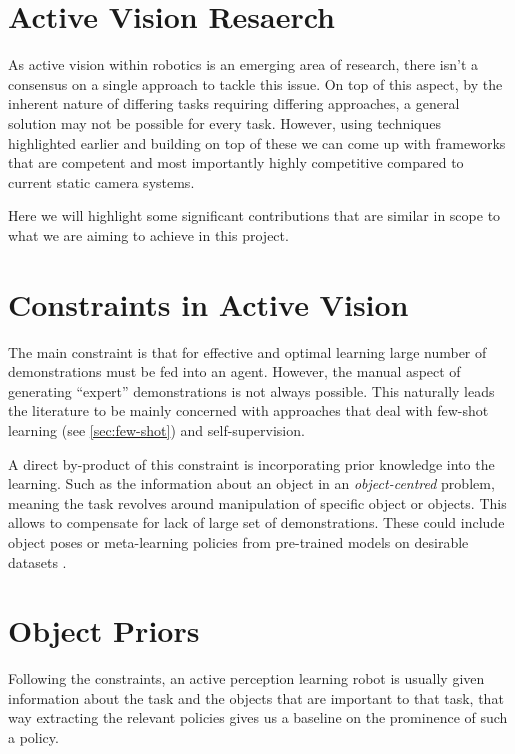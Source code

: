 \section{Active Vision Resaerch}

As active vision within robotics is an emerging area of research, there isn't a consensus on a single approach to tackle this issue. On top of this aspect, by the inherent nature of differing tasks requiring differing approaches, a general solution may not be possible for every task. However, using techniques highlighted earlier and building on top of these we can come up with frameworks that are competent and most importantly highly competitive compared to current static camera systems.

Here we will highlight some significant contributions that are similar in scope to what we are aiming to achieve in this project.

\section{Constraints in Active Vision}
The main constraint is that for effective and optimal learning large number of demonstrations must be fed into an agent. However, the manual aspect of generating ``expert'' demonstrations is not always possible. This naturally leads the literature to be mainly concerned with approaches that deal with few-shot learning (see \ref{sec:few-shot}) and self-supervision.

A direct by-product of this constraint is incorporating prior knowledge into the learning. Such as the information about an object in an \emph{object-centred} problem, meaning the task revolves around manipulation of specific object or objects. This allows to compensate for lack of large set of demonstrations. These could include object poses \cite{huang2018generalisedTPlearning, hu2023modelpredictiveoptimisation} or meta-learning policies from pre-trained models on desirable datasets \cite{finn2017oneshotvisualimitationlearning, mandi2022}.


\section{Object Priors}
Following the constraints, an active perception learning robot is usually given information about the task and the objects that are important to that task, that way extracting the relevant policies gives us a baseline on the prominence of such a policy.

